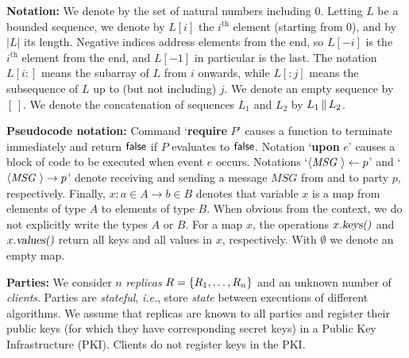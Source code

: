 
\textbf{Notation:} We denote by \BN the set of natural numbers including $0$.
Letting $L$ be a bounded sequence, we denote by $L[i]$ the $i^\text{th}$ element (starting from $0$),
and by $|L|$ its length.
Negative indices address elements from the end, so $L[-i]$ is the $i^\text{th}$ element from
the end, and $L[-1]$ in particular is the last.
The notation $L[i{:}]$ means the
subarray of $L$ from $i$ onwards, while $L[{:}j]$ means the subsequence of $L$ up to (but not including) $j$.
We denote an empty sequence by $[\,]$.
We denote the concatenation of sequences $L_1$ and $L_2$ by $L_1 \,\|\, L_2$.

\textbf{Pseudocode notation:} Command `\textbf{require} $P$' causes a function to terminate immediately and return $\mathsf{false}$ if $P$ evaluates to $\mathsf{false}$.
Notation `\textbf{upon} $e$' causes a block of code to be executed when event $e$ occurs.
Notations `$\msg{MSG}{} \leftarrow p$' and `$\msg{MSG}{} \rightarrow p$' denote receiving and sending a message $MSG$ from and to party $p$, respectively.
Finally, $x: a \in A \rightarrow b \in B$ denotes that variable $x$ is a map from elements of type $A$ to elements of type $B$. When obvious from the context, we do not explicitly write the types $A$ or $B$.
For a map $x$, the operations $x.\textsl{keys()}$ and $x.\textsl{values()}$ return all keys and all values in $x$, respectively.
With $\emptyset$ we denote an empty map.
\label{sec:system}

\textbf{Parties:}
We consider $n$ \emph{replicas} $R=\{R_1,\ldots,R_n\}$ and an unknown number of \emph{clients}. Parties are \emph{stateful}, \textit{i.e.}, store \emph{state} between executions of different algorithms.
We assume that replicas are known to all parties and register their public keys (for which they have corresponding secret keys) in a Public Key Infrastructure (PKI). Clients do not register keys in the PKI.

